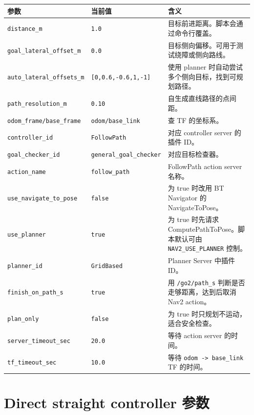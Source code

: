 \documentclass[UTF8,11pt,a4paper,openany]{ctexrep}
\newcommand{\code}[1]{\nolinkurl{#1}}
\newcommand{\topic}[1]{\nolinkurl{#1}}
\newcommand{\param}[1]{\nolinkurl{#1}}
\begin{document}
\begin{footnotesize}
\begin{longtable}{L{0.34\textwidth}L{0.17\textwidth}L{0.39\textwidth}}
\toprule
参数 & 当前值 & 含义 \\
\midrule
\param{distance_m} & \code{1.0} & 目标前进距离。脚本会通过命令行覆盖。 \\
\param{goal_lateral_offset_m} & \code{0.0} & 目标侧向偏移。可用于测试绕障或侧向路线。 \\
\param{auto_lateral_offsets_m} & \code{[0,0.6,-0.6,1,-1]} & 使用 planner 时自动尝试多个侧向目标，找到可规划路径。 \\
\param{path_resolution_m} & \code{0.10} & 自生成直线路径的点间距。 \\
\param{odom_frame/base_frame} & \code{odom/base_link} & 查 TF 的坐标系。 \\
\param{controller_id} & \code{FollowPath} & 对应 controller server 的插件 ID。 \\
\param{goal_checker_id} & \code{general_goal_checker} & 对应目标检查器。 \\
\param{action_name} & \code{follow_path} & FollowPath action server 名称。 \\
\param{use_navigate_to_pose} & \code{false} & 为 true 时改用 BT Navigator 的 NavigateToPose。 \\
\param{use_planner} & \code{true} & 为 true 时先请求 ComputePathToPose。脚本默认可由 \code{NAV2_USE_PLANNER} 控制。 \\
\param{planner_id} & \code{GridBased} & Planner Server 中插件 ID。 \\
\param{finish_on_path_s} & \code{true} & 用 \topic{/go2/path_s} 判断是否走够距离，达到后取消 Nav2 action。 \\
\param{plan_only} & \code{false} & 为 true 时只规划不运动，适合安全检查。 \\
\param{server_timeout_sec} & \code{20.0} & 等待 action server 的时间。 \\
\param{tf_timeout_sec} & \code{10.0} & 等待 \topic{odom -> base_link} TF 的时间。 \\
\bottomrule
\end{longtable}
\end{footnotesize}

\section{Direct straight controller 参数}
\end{document}
